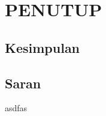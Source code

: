 \cleardoublepage
\chapter{PENUTUP}
\label{chap:penutup}
\section{Kesimpulan}

\section{Saran}
asdfas
